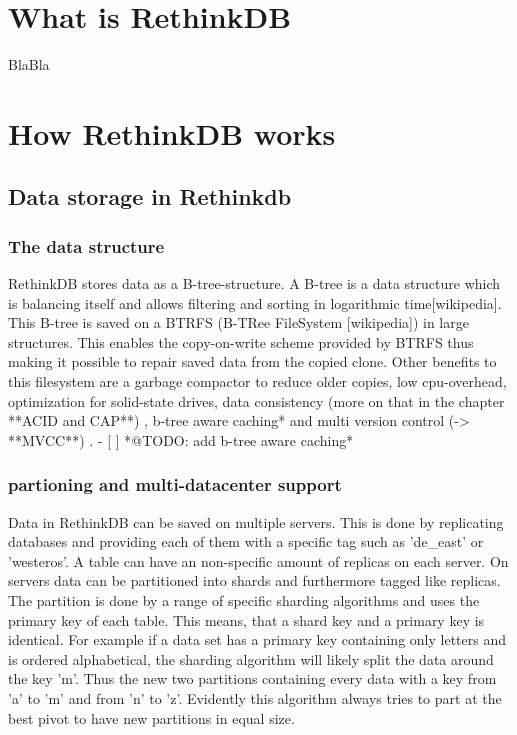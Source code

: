\section{What is RethinkDB}

BlaBla

\section{How RethinkDB works}

\subsection{Data storage in Rethinkdb}

\subsubsection{The data structure}

RethinkDB stores data as a B-tree-structure. A B-tree is a data structure which is balancing itself and allows filtering and sorting in logarithmic time[wikipedia]. This B-tree is saved on a BTRFS (B-TRee FileSystem [wikipedia]) in large structures. This enables the copy-on-write scheme provided by BTRFS thus making it possible to repair saved data from the copied clone. Other benefits to this filesystem are a garbage compactor to reduce older copies, low cpu-overhead, optimization for solid-state drives, data consistency (more on that in the chapter **ACID and CAP**) , b-tree aware caching* and multi version control (-> **MVCC**) .
- [ ] *@TODO: add b-tree aware caching*

\subsubsection{partioning and multi-datacenter support}

Data in RethinkDB can be saved on multiple servers. This is done by replicating databases and providing each of them with a specific tag such as 'de\_east' or 'westeros'. A table can have an non-specific amount of replicas on each server. 
On servers data can be partitioned into shards and furthermore tagged like replicas.  The partition is done by a range of specific sharding algorithms and uses the primary key of each table. This means, that a shard key and a primary key is identical. For example if a data set has a primary key containing only letters and is ordered alphabetical, the sharding algorithm will likely split the data around the key 'm'. Thus the new two partitions containing every data with a key from 'a' to 'm' and from 'n' to 'z'. Evidently this algorithm always tries to part at the best pivot to have new partitions in equal size.

